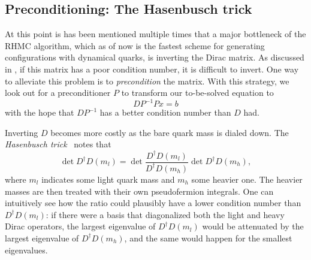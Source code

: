 \subsection{Preconditioning: The Hasenbusch trick}

At this point is has been mentioned multiple times that a major bottleneck
of the RHMC algorithm, which as of now is the fastest scheme for
generating configurations with dynamical quarks, is inverting the
Dirac matrix. As discussed in , if this matrix
has a poor condition number, it is difficult to invert.
One way to alleviate this problem is to {\it
precondition} the matrix. With this strategy,
we look out for a preconditioner $P$ to transform our to-be-solved equation to
\begin{equation}
DP^{-1}Px=b
\end{equation}
with the hope that $DP^{-1}$ has a better condition number than $D$ had.

Inverting $D$ becomes more costly as the bare quark mass is dialed down.
The {\it Hasenbusch trick}~\cite{hasenbusch_speeding_2001,urbach_hmc_2006}
notes that
\begin{equation}
\det D^{\dagger} D\left(m_l\right)=\det \frac{D^{\dagger}
D\left(m_l\right)}{D^{\dagger} D\left(m_h\right)} \det D^{\dagger}
D\left(m_h\right),
\end{equation}
where $m_l$ indicates some light quark mass and $m_h$ some heavier one.
The heavier masses are then treated with their own pseudofermion integrals.
One can intuitively see how the ratio could plausibly have a lower condition
number than $D^\dagger D(m_l)$: 
if there were a basis that diagonalized both the light and heavy Dirac
operators, the largest eigenvalue of $D^\dagger D(m_l)$ would be attenuated by
the largest eigenvalue of $D^\dagger D(m_h)$, and the same would happen for the
smallest eigenvalues.




